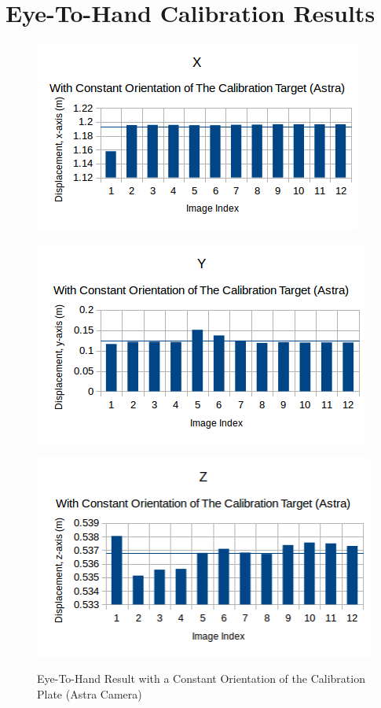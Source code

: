 \appendix
\chapter*{Eye-To-Hand Calibration Results}
\label{chap:resultsa}


\begin{figure}[htp]
\begin{center}
{
  \includegraphics[clip,width=0.5\columnwidth]{figures/astra/constantorientation_astra_x.png}%
}
\end{center}
\begin{center}
{
  \includegraphics[clip,width=0.5\columnwidth]{figures/astra/constantorientation_astra_y.png}%
}
\end{center}

\begin{center}
{
  \includegraphics[clip,width=0.5\columnwidth]{figures/astra/constantorientation_astra_z.png}%
}
\end{center}
\caption{Eye-To-Hand Result with a Constant Orientation of the Calibration Plate (Astra Camera)}
\end{figure}

